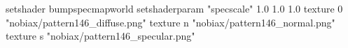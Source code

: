 setshader bumpspecmapworld
setshaderparam "specscale" 1.0 1.0 1.0
   texture 0 "nobiax/pattern146_diffuse.png"
   texture n "nobiax/pattern146_normal.png"
   texture s "nobiax/pattern146_specular.png"